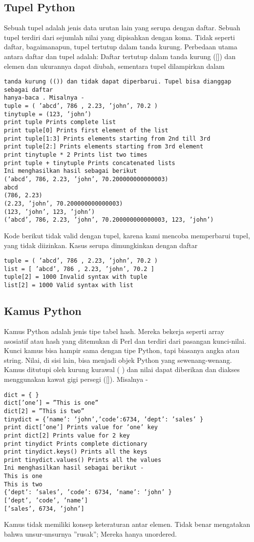 \begin{enumerate}
\subsection{Tupel Python}
Sebuah tupel adalah jenis data urutan lain yang serupa dengan daftar. Sebuah tupel terdiri dari sejumlah nilai yang dipisahkan dengan koma. Tidak seperti daftar,
bagaimanapun, tupel tertutup dalam tanda kurung.
Perbedaan utama antara daftar dan tupel adalah: Daftar tertutup dalam tanda kurung
([]) dan elemen dan ukurannya dapat diubah, sementara tupel dilampirkan dalam
\begin{verbatim}
tanda kurung (()) dan tidak dapat diperbarui. Tupel bisa dianggap sebagai daftar
hanya-baca . Misalnya -
tuple = ( ’abcd’, 786 , 2.23, ’john’, 70.2 )
tinytuple = (123, ’john’)
print tuple Prints complete list
print tuple[0] Prints first element of the list
print tuple[1:3] Prints elements starting from 2nd till 3rd
print tuple[2:] Prints elements starting from 3rd element
print tinytuple * 2 Prints list two times
print tuple + tinytuple Prints concatenated lists
Ini menghasilkan hasil sebagai berikut
(’abcd’, 786, 2.23, ’john’, 70.200000000000003)
abcd
(786, 2.23)
(2.23, ’john’, 70.200000000000003)
(123, ’john’, 123, ’john’)
(’abcd’, 786, 2.23, ’john’, 70.200000000000003, 123, ’john’)
\end{verbatim}
Kode berikut tidak valid dengan tupel, karena kami mencoba memperbarui tupel,
yang tidak diizinkan. Kasus serupa dimungkinkan dengan daftar 
\begin{verbatim}
tuple = ( ’abcd’, 786 , 2.23, ’john’, 70.2 )
list = [ ’abcd’, 786 , 2.23, ’john’, 70.2 ]
tuple[2] = 1000 Invalid syntax with tuple
list[2] = 1000 Valid syntax with list
\end{verbatim}

\subsection{Kamus Python}
Kamus Python adalah jenis tipe tabel hash. Mereka bekerja seperti array asosiatif
atau hash yang ditemukan di Perl dan terdiri dari pasangan kunci-nilai. Kunci kamus
bisa hampir sama dengan tipe Python, tapi biasanya angka atau string. Nilai, di sisi
lain, bisa menjadi objek Python yang sewenang-wenang.
Kamus ditutupi oleh kurung kurawal ( { }) dan nilai dapat diberikan dan diakses
menggunakan kawat gigi persegi ([]). Misalnya -
\begin{verbatim}
dict = { }
dict[’one’] = ”This is one”
dict[2] = ”This is two”
tinydict = {’name’: ’john’,’code’:6734, ’dept’: ’sales’ }
print dict[’one’] Prints value for ’one’ key
print dict[2] Prints value for 2 key
print tinydict Prints complete dictionary
print tinydict.keys() Prints all the keys
print tinydict.values() Prints all the values
Ini menghasilkan hasil sebagai berikut -
This is one
This is two
{’dept’: ’sales’, ’code’: 6734, ’name’: ’john’ }
[’dept’, ’code’, ’name’]
[’sales’, 6734, ’john’]
\end{verbatim}
Kamus tidak memiliki konsep keteraturan antar elemen. Tidak benar mengatakan
bahwa unsur-unsurnya ”rusak”; Mereka hanya unordered.


\end{enumerate}
